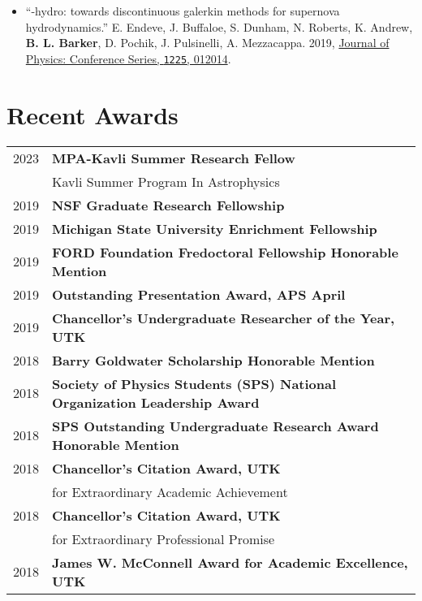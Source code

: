 \documentclass[letterpaper]{deedy-resume} %
\begin{document}
\begin{minipage}[t]{0.63\textwidth}
\begin{itemize}
  \item ``\thornado-hydro: towards discontinuous galerkin methods for supernova hydrodynamics.'' E. Endeve, J. Buffaloe, S. Dunham, N. Roberts, K. Andrew, \textbf{B. L. Barker}, D. Pochik, J. Pulsinelli, A. Mezzacappa. 2019, \href{https://doi.org/10.1088/1742-6596/1225/1/012014}{Journal of Physics: Conference Series, \texttt{1225}, 012014}.
   

\end{itemize}

\section{Recent Awards}
\begin{tabular}{rl}
  2023 & \textbf{MPA-Kavli Summer Research Fellow} \\
    & Kavli Summer Program In Astrophysics \\
  2019 & \textbf{NSF Graduate Research Fellowship} \\
  2019 & \textbf{Michigan State University Enrichment Fellowship} \\
  2019 & \textbf{FORD Foundation Fredoctoral Fellowship Honorable Mention} \\
  2019 & \textbf{Outstanding Presentation Award, APS April} \\
  2019 & \textbf{Chancellor's Undergraduate Researcher of the Year, UTK} \\
  2018 & \textbf{Barry Goldwater Scholarship Honorable Mention} \\
  2018 & \textbf{Society of Physics Students (SPS) National Organization Leadership Award} \\
  2018 & \textbf{SPS Outstanding Undergraduate Research Award Honorable Mention}\\
  2018 & \textbf{Chancellor’s Citation Award, UTK}\\ & for Extraordinary Academic Achievement \\
  2018 & \textbf{Chancellor’s Citation Award, UTK}\\ &  for Extraordinary Professional Promise \\
  2018 & \textbf{James W. McConnell Award for Academic Excellence, UTK} \\

\end{tabular}
\end{minipage}
\end{document}
